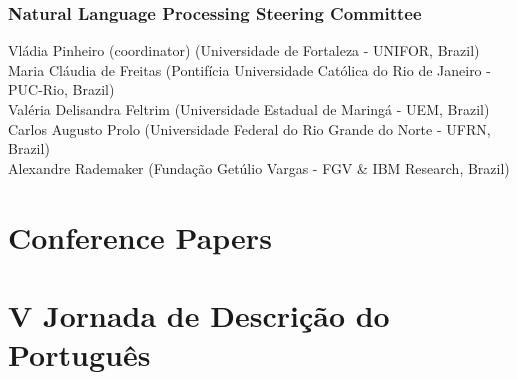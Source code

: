 \documentclass[english, titlepage, a4paper]{lni}
\begin{document}
\section*{Natural Language Processing Steering Committee}
Vl\'{a}dia Pinheiro (coordinator) (Universidade de Fortaleza - UNIFOR, Brazil) \\
Maria Cl\'{a}udia de Freitas (Pontif\'{i}cia Universidade Católica do Rio de Janeiro - PUC-Rio, Brazil) \\
Val\'{e}ria Delisandra Feltrim (Universidade Estadual de Maring\'{a} - UEM, Brazil) \\
Carlos Augusto Prolo (Universidade Federal do Rio Grande do Norte - UFRN, Brazil) \\
Alexandre Rademaker (Fundaç\~{a}o Get\'{u}lio Vargas - FGV \& IBM Research, Brazil) \\

\newpage
\markright{}
\tableofcontents



\part{Conference Papers}





\part{V Jornada de Descri\c{c}\~ao do Portugu\^es}


\end{document}
